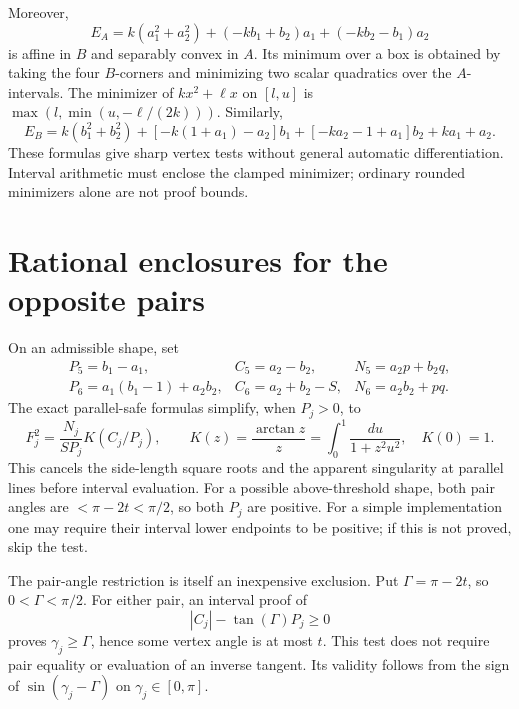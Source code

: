 \documentclass[11pt]{article}
\begin{document}
Moreover,
\[
 E_A=k(a_1^2+a_2^2)+(-kb_1+b_2)a_1+(-kb_2-b_1)a_2
\]
is affine in \(B\) and separably convex in \(A\). Its minimum over a box is
obtained by taking the four \(B\)-corners and minimizing two scalar quadratics
over the \(A\)-intervals. The minimizer of \(kx^2+\ell x\) on \([l,u]\) is
\(\max(l,\min(u,-\ell/(2k)))\).
Similarly,
\[
 E_B=k(b_1^2+b_2^2)+[-k(1+a_1)-a_2]b_1
                    +[-ka_2-1+a_1]b_2+ka_1+a_2.
\]
These formulas give sharp vertex tests without general automatic
differentiation. Interval arithmetic must enclose the clamped minimizer;
ordinary rounded minimizers alone are not proof bounds.

\section{Rational enclosures for the opposite pairs}
On an admissible shape, set
\[
\begin{array}{lll}
P_5=b_1-a_1,&C_5=a_2-b_2,&N_5=a_2p+b_2q,\\
P_6=a_1(b_1-1)+a_2b_2,&C_6=a_2+b_2-S,&N_6=a_2b_2+pq.
\end{array}
\]
The exact parallel-safe formulas simplify, when \(P_j>0\), to
\[
 F_j^2=\frac{N_j}{SP_j}K(C_j/P_j),\qquad
 K(z)=\frac{\arctan z}{z}
     =\int_0^1\frac{du}{1+z^2u^2},\quad K(0)=1.
\]
This cancels the side-length square roots and the apparent singularity at
parallel lines before interval evaluation.
For a possible above-threshold shape, both pair angles are
\(<\pi-2t<\pi/2\), so both \(P_j\) are positive. For a simple implementation
one may require their interval lower endpoints to be positive; if this is not
proved, skip the test.

The pair-angle restriction is itself an inexpensive exclusion. Put
\(\Gamma=\pi-2t\), so \(0<\Gamma<\pi/2\).
For either pair, an interval proof of
\[
 |C_j|-\tan(\Gamma)P_j\ge0
\]
proves \(\gamma_j\ge\Gamma\), hence some vertex angle is at most \(t\).
This test does not require pair equality or evaluation of an inverse tangent.
Its validity follows from the sign of \(\sin(\gamma_j-\Gamma)\) on
\(\gamma_j\in[0,\pi]\).
\end{document}
